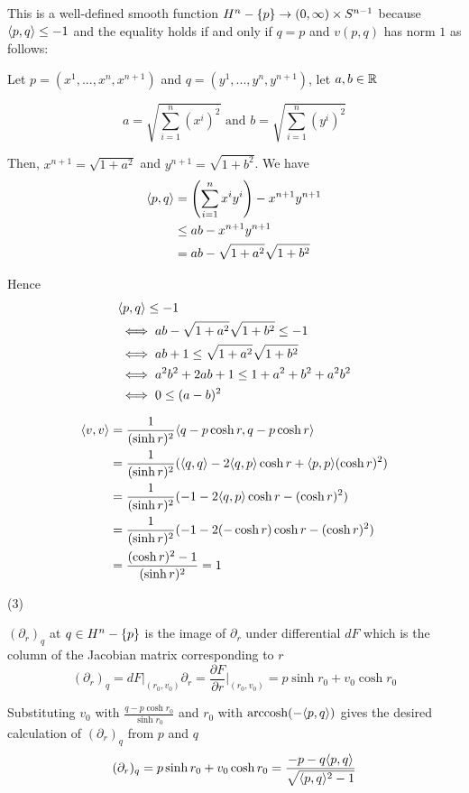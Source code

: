 \begin{longproof}
	This is a well-defined smooth function $H^n - \set{p} \to (0, \infty) \times S^{n-1}$ because $\inner{p, q} \leq -1 $ and the equality holds if and only if $q = p$ and $v(p, q)$ has norm $1$ as follows:
	
	 Let $p = (x^1, ..., x^n, x^{n+1})$ and $q = (y^1, ..., y^n, y^{n+1})$, let $a, b \in \R$
	
	$$
		a = \sqrt{\sum_{i=1}^n (x^i)^2} \text{ and } b = \sqrt{\sum_{i=1}^n (y^i)^2}
	$$
	
	Then, $x^{n+1} = \sqrt{1+a^2}$ and $y^{n+1} = \sqrt{1+b^2}$. We have
	\begin{align*}
		\inner{p, q} 
		&= \tuple*{\sum_{i=1}^n x^i y^i} - x^{n+1} y^{n+1} \\
		&\leq ab - x^{n+1} y^{n+1} \\
		&= ab - \sqrt{1+a^2}\sqrt{1+b^2}
	\end{align*}
	
	Hence
	\begin{align*}
		&\inner{p, q} \leq -1 \\
		&\iff ab - \sqrt{1+a^2}\sqrt{1+b^2} \leq -1 \\
		&\iff ab + 1 \leq \sqrt{1+a^2}\sqrt{1+b^2} \\
		&\iff a^2 b^2 + 2ab + 1 \leq 1 + a^2 + b^2 + a^2 b^2 \\
		&\iff 0 \leq (a - b)^2
	\end{align*}
	
	\begin{align*}
		\inner{v, v}
		&= \frac{1}{(\sinh r)^2} \inner{q - p \cosh r, q - p \cosh r} \\
		&= \frac{1}{(\sinh r)^2} (\inner{q, q} - 2 \inner{q, p} \cosh r + \inner{p, p} (\cosh r)^2) \\
		&= \frac{1}{(\sinh r)^2} (- 1 - 2 \inner{q, p} \cosh r - (\cosh r)^2) \\
		&= \frac{1}{(\sinh r)^2} (- 1 - 2 (- \cosh r) \cosh r - (\cosh r)^2) \\
		&= \frac{(\cosh r)^2 - 1}{(\sinh r)^2} = 1
	\end{align*}
	
	(3)
	
	$(\partial_r)_q$ at $q \in H^n - \set{p}$ is the image of $\partial_r$ under differential $dF$ which is the column of the Jacobian matrix corresponding to $r$
	$$
		(\partial_r)_q = dF\bigg\vert_{(r_0, v_0)} \partial_r = \frac{\partial F}{\partial r}\bigg\vert_{(r_0, v_0)} = p \sinh r_0 + v_0 \cosh r_0
	$$
	
	Substituting $v_0$ with $\frac{q - p \cosh r_0}{\sinh r_0}$ and $r_0$ with $\arccosh (- \inner{p, q})$ gives the desired calculation of $(\partial_r)_q$ from $p$ and $q$
	$$
		(\partial_r)_q = p \sinh r_0 + v_0 \cosh r_0 = \frac{- p - q \inner{p, q}}{\sqrt{\inner{p, q}^2 - 1}}
	$$


\end{longproof}
